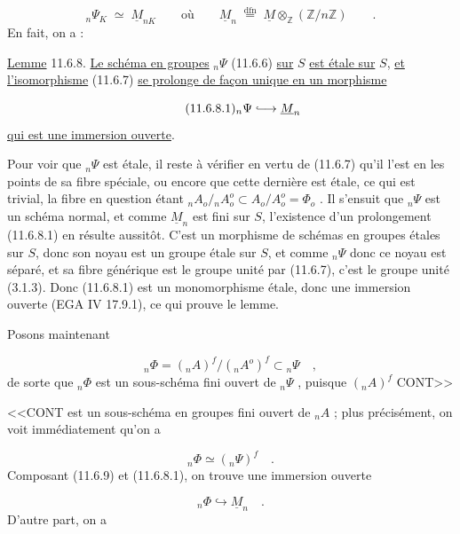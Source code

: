 \begin{equation}\tag{11.6.7}
{}_n\Psi_K \;\simeq\; \underline{M}_{nK} \qquad \mbox{où} \qquad \underline{M}_n \;\stackrel{\mathrm{dfn}}{=}\; \underline{M} \otimes_{\mathbb{Z}} (\mathbb{Z}/n\mathbb{Z}) \qquad .
\end{equation}
En fait, on a :

\underline{Lemme} 11.6.8. \underline{Le schéma en groupes} ${}_n\Psi$ (11.6.6) \underline{sur} $S$ \underline{est étale sur} $S$, \underline{et l'isomorphisme} (11.6.7) \underline{se prolonge de façon unique en un morphisme}

\begin{equation}\tag{11.6.8.1}
{}_n\Psi \lhook\joinrel\longrightarrow \underline{M}_n
\end{equation}
\underline{qui est une immersion ouverte}.

Pour voir que ${}_n\Psi$ est étale, il reste à vérifier en vertu de (11.6.7) qu'il l'est en les points de sa fibre spéciale, ou encore que cette dernière est étale, ce qui est trivial, la fibre en question étant ${}_nA_o/{}_nA_o^o \subset A_o/A_o^o = \Phi_o$ . Il s'ensuit que ${}_n\Psi$ est un schéma normal, et comme $\underline{M}_n$ est fini sur $S$, l'existence d'un prolongement (11.6.8.1) en résulte aussitôt. C'est un morphisme de schémas en groupes étales sur $S$, donc son noyau est un groupe étale sur $S$, et comme ${}_n\Psi$ donc ce noyau est séparé, et sa fibre générique est le groupe unité par (11.6.7), c'est le groupe unité (3.1.3). Donc (11.6.8.1) est un monomorphisme étale, donc une immersion ouverte (EGA IV 17.9.1), ce qui prouve le lemme.

Posons maintenant

\begin{equation}\tag{11.6.9}
{}_n\Phi = ({}_nA)^f/({}_nA^o)^f \subset {}_n\Psi \quad ,
\end{equation}
de sorte que ${}_n\Phi$ est un sous-schéma fini ouvert de ${}_n\Psi$ , puisque $({}_nA)^f$ CONT>>



<<CONT est un sous-schéma en groupes fini ouvert de ${}_nA$ ; plus précisément, on voit immédiatement qu'on a

\begin{equation}\tag{11.6.10}
{}_n\Phi \simeq ({}_n\Psi)^f \quad .
\end{equation}
Composant (11.6.9) et (11.6.8.1), on trouve une immersion ouverte

\begin{equation}\tag{11.6.11}
{}_n\Phi \hookrightarrow \underline{M}_n \quad .
\end{equation}
D'autre part, on a

